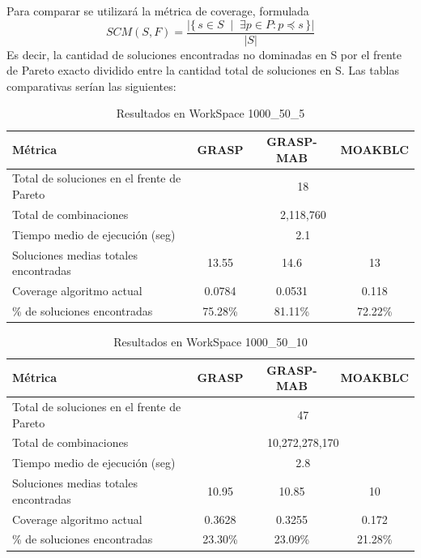\documentclass[12pt,a4paper]{book}
\begin{document}
Para comparar se utilizará la métrica de coverage, formulada
$$SCM(S,F) = \frac{\left| \{\, s \in S \;\mid\; \exists p \in P : p \preceq s \,\} \right|}{|S|}$$
Es decir, la cantidad de soluciones encontradas no dominadas en S por el frente de Pareto exacto dividido entre la cantidad total de soluciones en S.
Las tablas comparativas serían las siguientes:

\begin{table}[H]
\centering
\caption{Resultados en WorkSpace 1000\_50\_5}
\label{tab:ws1000_50_5}
\begin{tabular}{|l|c|c|c|}
\hline
\textbf{Métrica} & \textbf{GRASP} & \textbf{GRASP-MAB} & \textbf{MOAKBLC} \\ \hline
Total de soluciones en el frente de Pareto 
    & \multicolumn{3}{c|}{18} \\ \hline
Total de combinaciones 
    & \multicolumn{3}{c|}{2,118,760} \\ \hline
Tiempo medio de ejecución (seg) 
    & \multicolumn{3}{c|}{2.1} \\ \hline
Soluciones medias totales encontradas & 13.55 & 14.6 & 13 \\ \hline
Coverage algoritmo actual & 0.0784 & 0.0531 & 0.118 \\ \hline
\% de soluciones encontradas & 75.28\% & 81.11\% & 72.22\% \\ \hline
\end{tabular}
\end{table}

\begin{table}[H]
\centering
\caption{Resultados en WorkSpace 1000\_50\_10}
\label{tab:ws1000_50_10}
\begin{tabular}{|l|c|c|c|}
\hline
\textbf{Métrica} & \textbf{GRASP} & \textbf{GRASP-MAB} & \textbf{MOAKBLC} \\ \hline
Total de soluciones en el frente de Pareto 
    & \multicolumn{3}{c|}{47} \\ \hline
Total de combinaciones 
    & \multicolumn{3}{c|}{10,272,278,170} \\ \hline
Tiempo medio de ejecución (seg) 
    & \multicolumn{3}{c|}{2.8} \\ \hline
Soluciones medias totales encontradas & 10.95 & 10.85 & 10 \\ \hline
Coverage algoritmo actual & 0.3628 & 0.3255 & 0.172 \\ \hline
\% de soluciones encontradas & 23.30\% & 23.09\% & 21.28\% \\ \hline
\end{tabular}
\end{table}
\end{document}
